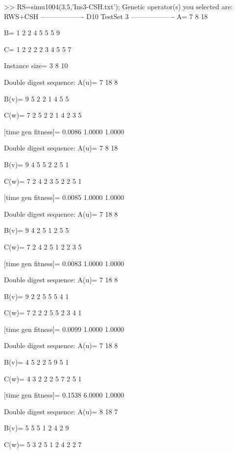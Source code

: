 >> RS=simu1004(3,5,'Ins3-CSH.txt');
Genetic operator(s) you selected are:
RWS+CSH
------------------- D10 TestSet 3 -------------------
A=
     7     8    18

B=
     1     2     2     4     5     5     5     9

C=
     1     2     2     2     2     3     4     5     5     7

Instance size=
     3     8    10

Double digest sequence:
A(u)=
     7    18     8

B(v)=
     9     5     2     2     1     4     5     5

C(w)=
     7     2     5     2     2     1     4     2     3     5

[time gen fitness]=
    0.0086    1.0000    1.0000

Double digest sequence:
A(u)=
     7     8    18

B(v)=
     9     4     5     5     2     2     5     1

C(w)=
     7     2     4     2     3     5     2     2     5     1

[time gen fitness]=
    0.0085    1.0000    1.0000

Double digest sequence:
A(u)=
     7    18     8

B(v)=
     9     4     2     5     1     2     5     5

C(w)=
     7     2     4     2     5     1     2     2     3     5

[time gen fitness]=
    0.0083    1.0000    1.0000

Double digest sequence:
A(u)=
     7    18     8

B(v)=
     9     2     2     5     5     5     4     1

C(w)=
     7     2     2     2     5     5     2     3     4     1

[time gen fitness]=
    0.0099    1.0000    1.0000

Double digest sequence:
A(u)=
     7    18     8

B(v)=
     4     5     2     2     5     9     5     1

C(w)=
     4     3     2     2     2     5     7     2     5     1

[time gen fitness]=
    0.1538    6.0000    1.0000

Double digest sequence:
A(u)=
     8    18     7

B(v)=
     5     5     5     1     2     4     2     9

C(w)=
     5     3     2     5     1     2     4     2     2     7


